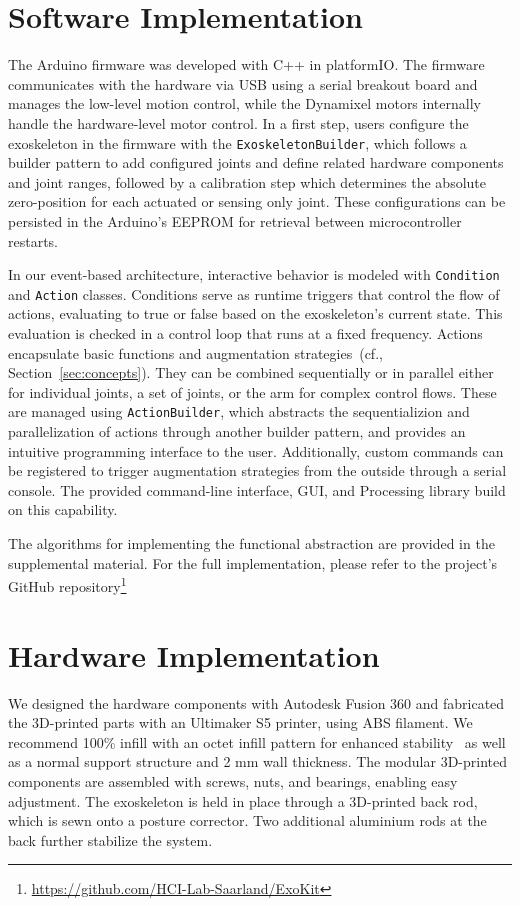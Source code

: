 \section{Software Implementation} \label{subsec:implementation_sw}
The Arduino firmware was developed with C++ in platformIO. The firmware communicates with the hardware via USB using a serial breakout board and manages the low-level motion control, while the Dynamixel motors internally handle the hardware-level motor control.
In a first step, users configure the exoskeleton in the firmware with the \texttt{ExoskeletonBuilder}, which follows a builder pattern to add configured joints and define related hardware components and joint ranges, followed by a calibration step which determines the absolute zero-position for each actuated or sensing only joint. These configurations can be persisted in the Arduino's EEPROM for retrieval between microcontroller restarts.

In our event-based architecture, interactive behavior is modeled with \texttt{Condition} and \texttt{Action} classes. Conditions serve as runtime triggers that control the flow of actions, evaluating to true or false based on the exoskeleton’s current state. This evaluation is checked in a control loop that runs at a fixed frequency. Actions encapsulate basic functions and augmentation strategies~(cf., Section~\ref{sec:concepts}). They can be combined sequentially or in parallel either for individual joints, a set of joints, or the arm for complex control flows. These are managed using \texttt{ActionBuilder}, which abstracts the sequentializion and parallelization of actions through another builder pattern, and provides an intuitive programming interface to the user.
Additionally, custom commands can be registered to trigger augmentation strategies from the outside through a serial console. The provided command-line interface, GUI, and Processing library build on this capability. 

The algorithms for implementing the functional abstraction are provided in the supplemental material. For the full implementation, please refer to the project's GitHub repository\footnote{\url{https://github.com/HCI-Lab-Saarland/ExoKit}}

\section{Hardware Implementation}\label{subsec:implementation_hw}
We designed the hardware components with Autodesk Fusion 360 and fabricated the 3D-printed parts with an Ultimaker S5 printer, using ABS filament. We recommend 100\% infill with an octet infill pattern for enhanced stability~\cite{pernet_2022} as well as a normal support structure and 2 mm wall thickness. The modular 3D-printed components are assembled with screws, nuts, and bearings, enabling easy adjustment.
The exoskeleton is held in place through a 3D-printed back rod, which is sewn onto a posture corrector. Two additional aluminium rods at the back further stabilize the system. 

